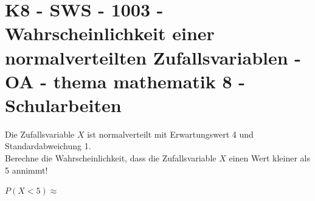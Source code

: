 \section{K8 - SWS - 1003 - Wahrscheinlichkeit einer normalverteilten Zufallsvariablen - OA - thema mathematik 8 - Schularbeiten}

\begin{beispiel}[K8 - SWS]{1}
Die Zufallsvariable $X$ ist normalverteilt mit Erwartungswert 4 und Standardabweichung 1.\\
Berechne die Wahrscheinlichkeit, dass die Zufallsvariable $X$ einen Wert kleiner als 5 annimmt!

$P(X<5)\approx$\,

\end{beispiel}